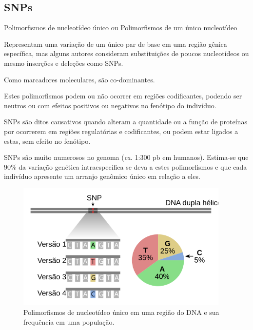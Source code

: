 \documentclass[
]{book}
\begin{document}
\hypertarget{snps}{%
\subsection{SNPs}\label{snps}}

Polimorfismos de nucleotídeo único ou Polimorfismos de um único nucleotídeo

Representam uma variação de um único par de base em uma região gênica específica, mas alguns autores consideram substituições de poucos nucleotídeos ou mesmo inserções e deleções como SNPs.

Como marcadores moleculares, são co-dominantes.

Estes polimorfismos podem ou não ocorrer em regiões codificantes, podendo ser neutros ou com efeitos positivos ou negativos no fenótipo do indivíduo.

SNPs são ditos causativos quando alteram a quantidade ou a função de proteínas por ocorrerem em regiões regulatórias e codificantes, ou podem estar ligados a estas, sem efeito no fenótipo.

SNPs são muito numerosos no genoma (\emph{ca.} 1:300 pb em humanos). Estima-se que 90\% da variação genética intraespecífica se deva a estes polimorfismos e que cada indivíduo apresente um arranjo genômico único em relação a eles.

\begin{figure}

{\centering \includegraphics[width=400px]{figs/SNPs_scheme} 

}

\caption{Polimorfismos de nucleotídeo único em uma região do DNA e sua frequência em uma população. }\label{fig:SNPs}
\end{figure}
\end{document}
